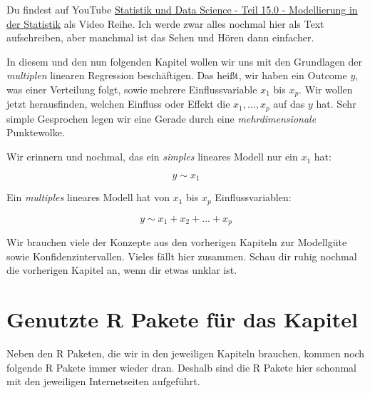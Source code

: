 \documentclass[
  letterpaper,
]{scrbook}
\begin{document}
\begin{tcolorbox}[enhanced jigsaw, coltitle=black, titlerule=0mm, bottomrule=.15mm, opacityback=0, opacitybacktitle=0.6, leftrule=.75mm, title=\textcolor{quarto-callout-tip-color}{\faLightbulb}\hspace{0.5em}{Modellierung in der Statistik}, toprule=.15mm, bottomtitle=1mm, toptitle=1mm, left=2mm, breakable, arc=.35mm, colback=white, rightrule=.15mm, colbacktitle=quarto-callout-tip-color!10!white, colframe=quarto-callout-tip-color-frame]
Du findest auf YouTube \href{https://youtu.be/2fXExWzipDI}{Statistik und
Data Science - Teil 15.0 - Modellierung in der Statistik} als Video
Reihe. Ich werde zwar alles nochmal hier als Text aufschreiben, aber
manchmal ist das Sehen und Hören dann einfacher.
\end{tcolorbox}

In diesem und den nun folgenden Kapitel wollen wir uns mit den
Grundlagen der \emph{multiplen} linearen Regression beschäftigen. Das
heißt, wir haben ein Outcome \(y\), was einer Verteilung folgt, sowie
mehrere Einflussvariable \(x_1\) bis \(x_p\). Wir wollen jetzt
herausfinden, welchen Einfluss oder Effekt die \(x_1, ..., x_p\) auf das
\(y\) hat. Sehr simple Gesprochen legen wir eine Gerade durch eine
\emph{mehrdimensionale} Punktewolke.

Wir erinnern und nochmal, das ein \emph{simples} lineares Modell nur ein
\(x_1\) hat:

\[
y \sim x_1
\]

Ein \emph{multiples} lineares Modell hat von \(x_1\) bis \(x_p\)
Einflussvariablen:

\[
y \sim x_1 + x_2 + ... + x_p
\]

Wir brauchen viele der Konzepte aus den vorherigen Kapiteln zur
Modellgüte sowie Konfidenzintervallen. Vieles fällt hier zusammen. Schau
dir ruhig nochmal die vorherigen Kapitel an, wenn dir etwas unklar ist.

\hypertarget{genutzte-r-pakete-fuxfcr-das-kapitel-18}{%
\section*{Genutzte R Pakete für das
Kapitel}\label{genutzte-r-pakete-fuxfcr-das-kapitel-18}}

Neben den R Paketen, die wir in den jeweiligen Kapiteln brauchen, kommen
noch folgende R Pakete immer wieder dran. Deshalb sind die R Pakete hier
schonmal mit den jeweiligen Internetseiten aufgeführt.
\end{document}
